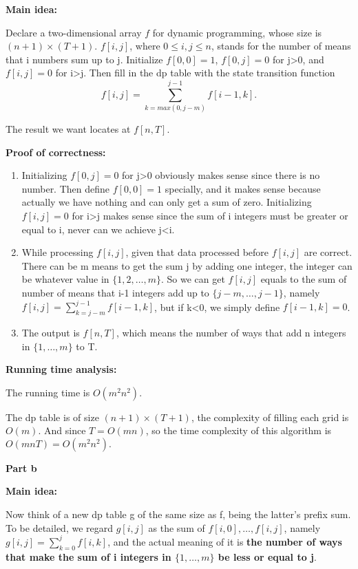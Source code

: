 \documentclass{article}
\begin{document}
\textbf{Main idea:}

Declare a two-dimensional array $f$ for dynamic programming, whose size is $(n+1)\times (T+1)$. $f[i,j]$, where $0\leq i,j\leq n$, stands for the number of means that i numbers sum up to j.
Initialize $f[0,0]=1$, $f[0,j]=0$ for j>0, and $f[i,j]=0$ for i>j.
Then fill in the dp table with the state transition function $$f[i,j]=\sum_{k=max(0,j-m)}^{j-1}f[i-1,k].$$

The result we want locates at $f[n,T]$.

\textbf{Proof of correctness:}

\begin{enumerate}
	\item Initializing $f[0,j]=0$ for j>0 obviously makes sense since there is no number. Then define $f[0,0]=1$ specially, and it makes sense because actually we have nothing and can only get a sum of zero. Initializing $f[i,j]=0$ for i>j makes sense since the sum of i integers must be greater or equal to i, never can we achieve j<i.
	\item While processing $f [i, j]$, given that data processed before $f [i, j]$ are correct. There can be m means to get the sum j by adding one integer, the integer can be whatever value in $\{1,2,\dots,m\}$. So we can get $f[i,j]$ equals to the sum of number of means that i-1 integers add up to $\{j-m,\dots,j-1\}$, namely $f[i,j]=\sum_{k=j-m}^{j-1}f[i-1,k]$, but if k<0, we simply define $f[i-1,k]=0$.
	\item The output is $f[n,T]$, which means the number of ways that add n integers in $\{1,\dots,m\}$ to T.
\end{enumerate}

\textbf{Running time analysis:}

The running time is $O(m^2n^2)$.

The dp table is of size $(n+1)\times (T+1)$, the complexity of filling each grid is $O(m)$.
And since $T=O(mn)$, so the time complexity of this algorithm is $O(mnT)=O(m^2n^2).$

\pagebreak

\textbf{Part b}

\textbf{Main idea:}

Now think of a new dp table g of the same size as f, being the latter's prefix sum. To be detailed, we regard $g[i,j]$ as the sum of $f[i,0],\dots,f[i,j]$, namely $g[i,j]=\sum_{k=0}^{j}f[i,k]$, and the actual meaning of it is \textbf{the number of ways that make the sum of i integers in $\{1,\dots,m\}$ be less or equal to j}.
\end{document}
